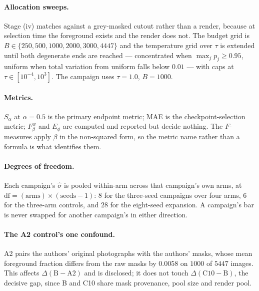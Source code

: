 \documentclass{article} %
\newcommand{\atemp}{\tau}
\begin{document}
\paragraph{Allocation sweeps.} Stage (iv) matches against a grey-masked cutout rather than a render,
because at selection time the foreground exists and the render does not. The budget grid is
$B \in \{250, 500, 1000, 2000, 3000, 4447\}$ and the temperature grid over $\atemp$ is extended
until both degenerate ends are reached --- concentrated when $\max_j p_j \geq 0.95$, uniform when
total variation from uniform falls below $0.01$ --- with caps at $\atemp \in [10^{-4}, 10^{3}]$. The
campaign uses $\atemp = 1.0$, $B = 1000$.

\paragraph{Metrics.} $S_\alpha$ at $\alpha = 0.5$ is the primary endpoint metric; MAE is the
checkpoint-selection metric; $F_\beta^w$ and $E_\phi$ are computed and reported but decide nothing.
The $F$-measures apply $\beta$ in the non-squared form, so the metric name rather than a formula is
what identifies them.

\paragraph{Degrees of freedom.} Each campaign's $\hat{\sigma}$ is pooled within-arm across that
campaign's own arms, at $\mathrm{df} = (\text{arms}) \times (\text{seeds} - 1)$: $8$ for the
three-seed campaigns over four arms, $6$ for the three-arm controls, and $28$ for the eight-seed
expansion. A campaign's bar is never swapped for another campaign's in either direction.

\paragraph{The A2 control's one confound.} A2 pairs the authors' original photographs with the
authors' masks, whose mean foreground fraction differs from the raw masks by $0.0058$ on $1000$ of
$5447$ images. This affects $\Delta(\mathrm{B}-\mathrm{A2})$ and is disclosed; it does not touch
$\Delta(\mathrm{C10}-\mathrm{B})$, the decisive gap, since B and C10 share mask provenance, pool
size and render pool.
\end{document}
